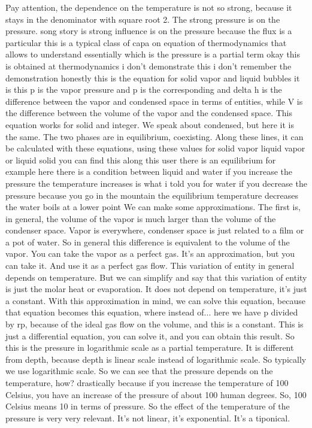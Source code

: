 Pay attention, the dependence on the temperature is not so strong, because it stays in the denominator with square root 2. The strong pressure is on the pressure. song story is strong influence is on the pressure because the flux is a particular this is a typical class of capa on equation of thermodynamics that allows to understand essentially which is the pressure is a partial term okay this is obtained at thermodynamics i don't demonstrate this i don't remember the demonstration honestly this is the equation for solid vapor and liquid bubbles it is this p is the vapor pressure and p is the corresponding and delta h is the difference between the vapor and condensed space in terms of entities, while V is the difference between the volume of the vapor and the condensed space. This equation works for solid and integer. We speak about condensed, but here it is the same. The two phases are in equilibrium, coexisting. Along these lines, it can be calculated with these equations, using these values for solid vapor liquid vapor or liquid solid you can find this along this user there is an equilibrium for example here there is a condition between liquid and water if you increase the pressure the temperature increases is what i told you for water if you decrease the pressure because you go in the mountain the equilibrium temperature decreases the water boils at a lower point We can make some approximations. The first is, in general, the volume of the vapor is much larger than the volume of the condenser space. Vapor is everywhere, condenser space is just related to a film or a pot of water. So in general this difference is equivalent to the volume of the vapor. You can take the vapor as a perfect gas. It's an approximation, but you can take it. And use it as a perfect gas flow. This variation of entity in general depends on temperature. But we can simplify and say that this variation of entity is just the molar heat or evaporation. It does not depend on temperature, it's just a constant. With this approximation in mind, we can solve this equation, because that equation becomes this equation, where instead of... here we have p divided by rp, because of the ideal gas flow on the volume, and this is a constant. This is just a differential equation, you can solve it, and you can obtain this result. So this is the pressure in logarithmic scale as a partial temperature. It is different from depth, because depth is linear scale instead of logarithmic scale. So typically we use logarithmic scale. So we can see that the pressure depends on the temperature, how? drastically because if you increase the temperature of 100 Celsius, you have an increase of the pressure of about 100 human degrees. So, 100 Celsius means 10 in terms of pressure. So the effect of the temperature of the pressure is very very relevant. It's not linear, it's exponential. It's a tiponical.
